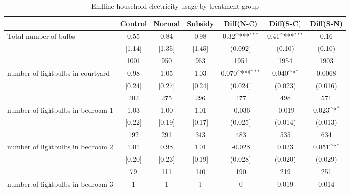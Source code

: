 \begin{table}[htbp]\centering
\def\sym#1{\ifmmode^{#1}\else\(^{#1}\)\fi}
\caption{Endline household electricity usage by treatment group \label{tab:"balance"}}
\begin{tabular*}{1\hsize}{@{\hskip\tabcolsep\extracolsep\fill}l*{1}{cccccc}}
\toprule
                                &  Control&   Normal&  Subsidy&Diff(N-C)         &Diff(S-C)         &Diff(S-N)         \\
\midrule
Total number of bulbs           &     0.55&     0.84&     0.98&     0.32\sym{***}&     0.41\sym{***}&     0.16         \\
                                &   [1.14]&   [1.35]&   [1.45]&  (0.092)         &   (0.10)         &   (0.10)         \\
                                &     1001&      950&      953&     1951         &     1954         &     1903         \\
number of lightbulbs in courtyard&     0.98&     1.05&     1.03&    0.070\sym{***}&    0.040\sym{*}  &   0.0068         \\
                                &   [0.24]&   [0.27]&   [0.24]&  (0.024)         &  (0.023)         &  (0.016)         \\
                                &      202&      275&      296&      477         &      498         &      571         \\
number of lightbulbs in bedroom 1&     1.03&     1.00&     1.01&   -0.036         &   -0.019         &    0.023\sym{*}  \\
                                &   [0.22]&   [0.19]&   [0.17]&  (0.025)         &  (0.014)         &  (0.013)         \\
                                &      192&      291&      343&      483         &      535         &      634         \\
number of lightbulbs in bedroom 2&     1.01&     0.98&     1.01&   -0.028         &    0.023         &    0.051\sym{*}  \\
                                &   [0.20]&   [0.23]&   [0.19]&  (0.028)         &  (0.020)         &  (0.029)         \\
                                &       79&      111&      140&      190         &      219         &      251         \\
number of lightbulbs in bedroom 3&        1&        1&        1&        0         &    0.019         &    0.014         \\

\end{tabular*}
\end{table}
